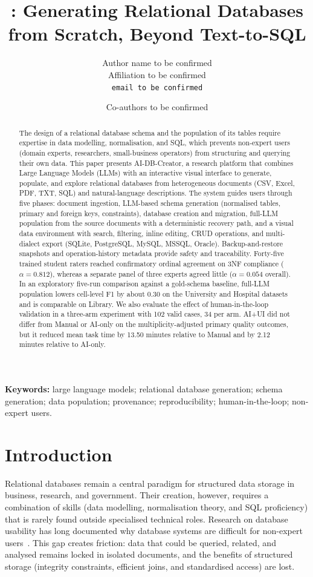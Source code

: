 \documentclass[11pt,a4paper]{article}
\title{\textbf{\aidb: Generating Relational Databases from Scratch, Beyond Text-to-SQL}}
\author{
  Author name to be confirmed\\
  \small Affiliation to be confirmed\\
  \small \texttt{email to be confirmed}
  \and
  Co-authors to be confirmed
}
\date{}
\newcommand{\aidb}{AI-DB-Creator}
\begin{document}
\maketitle

\begin{abstract}
The design of a relational database schema and the population of its tables require expertise in data modelling, normalisation, and SQL, which prevents non-expert users (domain experts, researchers, small-business operators) from structuring and querying their own data. This paper presents \aidb, a research platform that combines Large Language Models (LLMs) with an interactive visual interface to generate, populate, and explore relational databases from heterogeneous documents (CSV, Excel, PDF, TXT, SQL) and natural-language descriptions. The system guides users through five phases: document ingestion, LLM-based schema generation (normalised tables, primary and foreign keys, constraints), database creation and migration, full-LLM population from the source documents with a deterministic recovery path, and a visual data environment with search, filtering, inline editing, CRUD operations, and multi-dialect export (SQLite, PostgreSQL, MySQL, MSSQL, Oracle). Backup-and-restore snapshots and operation-history metadata provide safety and traceability. Forty-five trained student raters reached confirmatory ordinal agreement on 3NF compliance ($\alpha=0.812$), whereas a separate panel of three experts agreed little ($\alpha=0.054$ overall). In an exploratory five-run comparison against a gold-schema baseline, full-LLM population lowers cell-level F1 by about 0.30 on the University and Hospital datasets and is comparable on Library. We also evaluate the effect of human-in-the-loop validation in a three-arm experiment with 102 valid cases, 34 per arm. AI+UI did not differ from Manual or AI-only on the multiplicity-adjusted primary quality outcomes, but it reduced mean task time by 13.50 minutes relative to Manual and by 2.12 minutes relative to AI-only.
\end{abstract}

\noindent\textbf{Keywords:} large language models; relational database generation; schema generation; data population; provenance; reproducibility; human-in-the-loop; non-expert users.

\section{Introduction}
Relational databases remain a central paradigm for structured data storage in business, research, and government. Their creation, however, requires a combination of skills (data modelling, normalisation theory, and SQL proficiency) that is rarely found outside specialised technical roles. Research on database usability has long documented why database systems are difficult for non-expert users~\citep{jagadish2007usable}. This gap creates friction: data that could be queried, related, and analysed remains locked in isolated documents, and the benefits of structured storage (integrity constraints, efficient joins, and standardised access) are lost.
\end{document}
